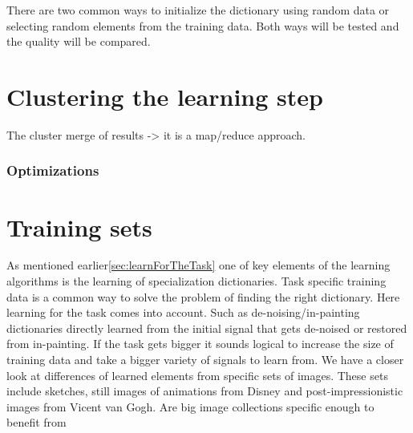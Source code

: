 There are two common ways to initialize the dictionary using random data or
selecting random elements from the training data. Both ways will be tested and 
the quality will be compared.

\section{Clustering the learning step}

The cluster merge of results -> 
it is a map/reduce approach. 

\subsubsection*{Optimizations}

\section{Training sets}
As mentioned earlier\ref{sec:learnForTheTask} one of key elements 
of the learning algorithms is the learning of specialization dictionaries.
Task specific training data is a common way to solve the problem of finding 
the right dictionary. Here learning for the task comes into
account. Such as de-noising/in-painting dictionaries directly learned from the
initial signal that gets de-noised or restored from in-painting. If the task
gets bigger it sounds logical to increase the size of training data and take a
bigger variety of signals to learn from.  We have a closer look at differences
of learned elements from specific sets of images. These sets include sketches,
still images of animations from Disney and post-impressionistic images from
Vicent van Gogh. 
Are big image collections specific enough to benefit from 



